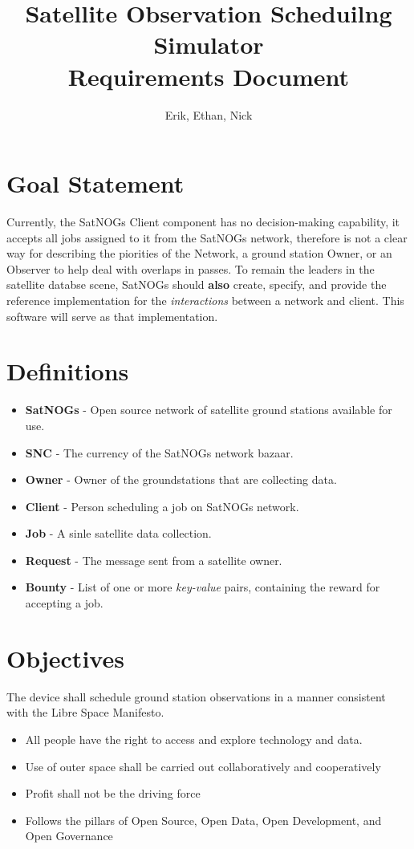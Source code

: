 \documentclass{article}
\title{Satellite Observation Scheduilng Simulator\\Requirements Document}
\author{Erik, Ethan, Nick}
\begin{document}
\maketitle

\section{Goal Statement}

Currently, the SatNOGs Client component has no decision-making capability, it
accepts all jobs assigned to it from the SatNOGs network, therefore is not a
clear way for describing the piorities of the Network, a ground station Owner,
or an Observer to help deal with overlaps in passes. To remain the leaders in
the satellite databse scene, SatNOGs should \textbf{also} create, specify, and
provide the reference implementation for the \textit{interactions} between a
network and client. This software will serve as that implementation.

\section{Definitions}

\begin{itemize}
	\item \textbf{SatNOGs} - Open source network of satellite ground stations available for use.
	\item \textbf{SNC} - The currency of the SatNOGs network bazaar.
	\item \textbf{Owner} - Owner of the groundstations that are collecting data.
	\item \textbf{Client} - Person scheduling a job on SatNOGs network.
	\item \textbf{Job} - A sinle satellite data collection.
	\item \textbf{Request} - The message sent from a satellite owner.
	\item \textbf{Bounty} - List of one or more \textit{key-value} pairs, containing the reward for accepting a job.
\end{itemize}


\section{Objectives}

The device shall schedule ground station observations in a manner consistent
with the Libre Space Manifesto.

\begin{itemize}
	\item All people have the right to access and explore technology and data.
	\item Use of outer space shall be carried out collaboratively and cooperatively
	\item Profit shall not be the driving force
	\item Follows the pillars of Open Source, Open Data, Open Development, and Open Governance
\end{itemize}
\end{document}
